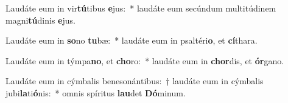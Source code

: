 \item Laudáte eum in vir\textbf{tú}tibus \textbf{e}jus:~* laudáte eum secúndum multitúdinem magni\textbf{tú}dinis \textbf{e}jus.
\item Laudáte eum in \textbf{so}no \textbf{tu}bæ:~* laudáte eum in psaltéri\textbf{o}, et \textbf{cí}thara.
\item Laudáte eum in týmpa\textbf{no}, et \textbf{cho}ro:~* laudáte eum in \textbf{chor}dis, et \textbf{ór}gano.
\item Laudáte eum in cýmbalis benesonántibus:~† laudáte eum in cýmbalis jubi\textbf{la}ti\textbf{ó}nis:~* omnis spíritus \textbf{lau}det \textbf{Dó}minum.
